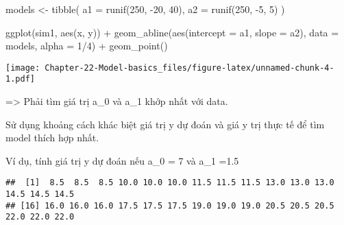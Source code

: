 \documentclass[
]{article}
\newenvironment{Shaded}{\begin{snugshade}}{\end{snugshade}}
\newcommand{\AttributeTok}[1]{\textcolor[rgb]{0.77,0.63,0.00}{#1}}
\newcommand{\ControlFlowTok}[1]{\textcolor[rgb]{0.13,0.29,0.53}{\textbf{#1}}}
\newcommand{\DecValTok}[1]{\textcolor[rgb]{0.00,0.00,0.81}{#1}}
\newcommand{\FloatTok}[1]{\textcolor[rgb]{0.00,0.00,0.81}{#1}}
\newcommand{\FunctionTok}[1]{\textcolor[rgb]{0.00,0.00,0.00}{#1}}
\newcommand{\NormalTok}[1]{#1}
\newcommand{\OtherTok}[1]{\textcolor[rgb]{0.56,0.35,0.01}{#1}}
\newcommand{\SpecialCharTok}[1]{\textcolor[rgb]{0.00,0.00,0.00}{#1}}
\begin{document}
\begin{Shaded}
\begin{Highlighting}[]
\NormalTok{models }\OtherTok{\textless{}{-}} \FunctionTok{tibble}\NormalTok{(}
  \AttributeTok{a1 =} \FunctionTok{runif}\NormalTok{(}\DecValTok{250}\NormalTok{, }\SpecialCharTok{{-}}\DecValTok{20}\NormalTok{, }\DecValTok{40}\NormalTok{),}
  \AttributeTok{a2 =} \FunctionTok{runif}\NormalTok{(}\DecValTok{250}\NormalTok{, }\SpecialCharTok{{-}}\DecValTok{5}\NormalTok{, }\DecValTok{5}\NormalTok{)}
\NormalTok{)}

\FunctionTok{ggplot}\NormalTok{(sim1, }\FunctionTok{aes}\NormalTok{(x, y)) }\SpecialCharTok{+} 
  \FunctionTok{geom\_abline}\NormalTok{(}\FunctionTok{aes}\NormalTok{(}\AttributeTok{intercept =}\NormalTok{ a1, }\AttributeTok{slope =}\NormalTok{ a2), }\AttributeTok{data =}\NormalTok{ models, }\AttributeTok{alpha =} \DecValTok{1}\SpecialCharTok{/}\DecValTok{4}\NormalTok{) }\SpecialCharTok{+}
  \FunctionTok{geom\_point}\NormalTok{() }
\end{Highlighting}
\end{Shaded}

\texttt{[image: Chapter-22-Model-basics\_files/figure-latex/unnamed-chunk-4-1.pdf]}

=\textgreater{} Phải tìm giá trị a\_0 và a\_1 khớp nhất với data.

Sử dụng khoảng cách khác biệt giá trị y dự đoán và giá y trị thực tế để
tìm model thích hợp nhất.

Ví dụ, tính giá trị y dự đoán nếu a\_0 = 7 và a\_1 =1.5

\begin{Shaded}
\end{Shaded}

\begin{verbatim}
##  [1]  8.5  8.5  8.5 10.0 10.0 10.0 11.5 11.5 11.5 13.0 13.0 13.0 14.5 14.5 14.5
## [16] 16.0 16.0 16.0 17.5 17.5 17.5 19.0 19.0 19.0 20.5 20.5 20.5 22.0 22.0 22.0
\end{verbatim}
\end{document}
